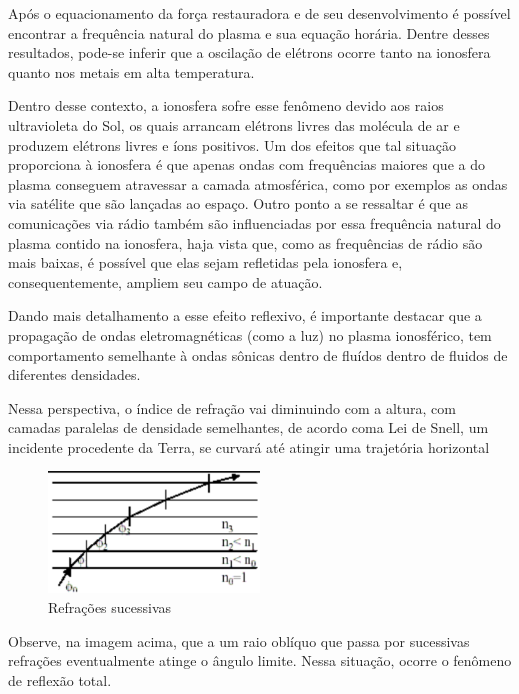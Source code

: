 \documentclass[
	article,
	11pt,
	oneside,
	a4paper,
	english,
	brazil,
	sumario=tradicional
	]{abntex2}
\begin{document}
 Após o equacionamento da força restauradora e de seu desenvolvimento é possível encontrar a frequência natural do plasma e sua equação horária. Dentre desses resultados, pode-se inferir que a oscilação de elétrons ocorre tanto na ionosfera quanto nos metais em alta temperatura.

 Dentro desse contexto, a ionosfera sofre esse fenômeno devido aos raios ultravioleta do Sol, os quais arrancam elétrons livres das molécula de ar e produzem elétrons livres e íons positivos. Um dos efeitos que tal situação proporciona à ionosfera é que apenas ondas com frequências maiores que a do plasma conseguem atravessar a camada atmosférica, como por exemplos as ondas via satélite que são lançadas ao espaço. Outro ponto a se ressaltar é que as comunicações via rádio também são influenciadas por essa frequência natural do plasma contido na ionosfera, haja vista que, como as frequências de rádio são mais baixas, é possível que elas sejam refletidas pela ionosfera e, consequentemente, ampliem seu campo de atuação.

 Dando mais detalhamento a esse efeito reflexivo, é importante destacar que a propagação de ondas eletromagnéticas (como a luz) no plasma ionosférico, tem comportamento semelhante à ondas sônicas dentro de fluídos dentro de fluidos de diferentes densidades.

Nessa perspectiva, o índice de refração vai diminuindo com a altura, com camadas paralelas de densidade semelhantes, de acordo coma Lei de Snell, um incidente procedente da Terra, se curvará até atingir uma trajetória horizontal

\begin{figure}[htb]
    \caption{\label{refracao}Refrações sucessivas}
    \centering
    \includegraphics[width=0.5\textwidth]{refracao.png}
\end{figure}

 Observe, na imagem acima, que a um raio oblíquo que passa por sucessivas refrações eventualmente atinge o ângulo limite. Nessa situação, ocorre o fenômeno de reflexão total.
\end{document}
